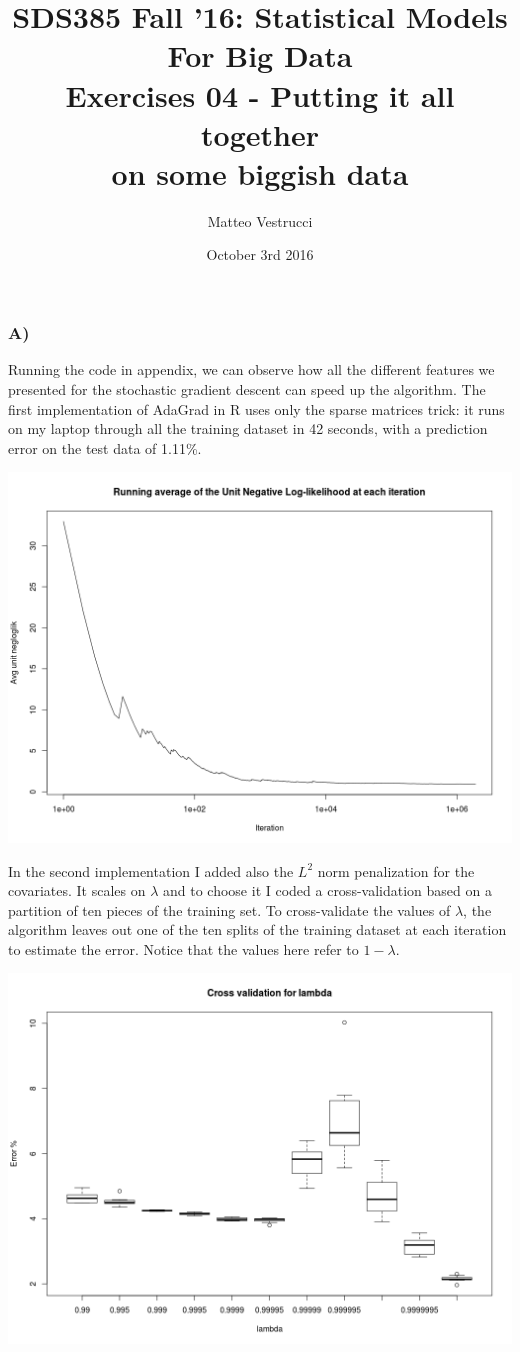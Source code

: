 \documentclass{article}
\title{SDS385 Fall '16: Statistical Models For Big Data\\Exercises 04 - Putting it all together\\on some biggish data}
\author{Matteo Vestrucci}
\date{October 3rd 2016}
\begin{document}
\maketitle
\bigskip\bigskip\bigskip

\subsubsection*{A)}

Running the code in appendix, we can observe how all the different features we presented for the stochastic gradient descent can speed up the algorithm. The first implementation of AdaGrad in R uses only the sparse matrices trick: it runs on my laptop through all the training dataset in 42 seconds, with a prediction error on the test data of 1.11\%.

\includegraphics[width=\textwidth]{Rplot_biggish01.png}

In the second implementation I added also the $L^2$ norm penalization for the covariates. It scales on $\lambda$ and to choose it I coded a cross-validation based on a partition of ten pieces of the training set. To cross-validate the values of $\lambda$, the algorithm leaves out one of the ten splits of the training dataset at each iteration to estimate the error. Notice that the values here refer to $1-\lambda$.

\includegraphics[width=\textwidth]{Rplot_biggish02.png}
\end{document}

